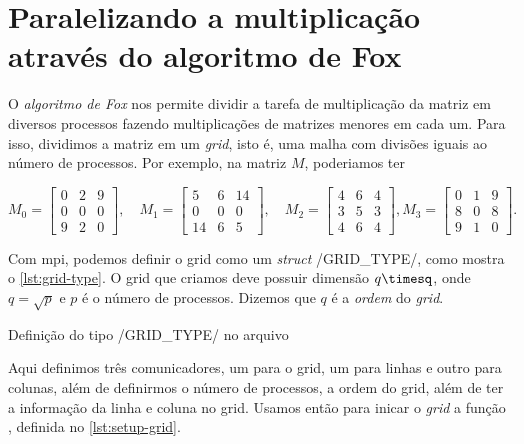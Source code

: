 \section{Paralelizando a multiplicação através do algoritmo de Fox}

O \emph{algoritmo de Fox} nos permite dividir a tarefa de multiplicação
da matriz em diversos processos fazendo multiplicações de matrizes menores
em cada um. Para isso, dividimos a matriz em um \emph{grid}, isto é,
uma malha com divisões iguais ao número de processos. Por exemplo,
na matriz \(M\), poderiamos ter

\[
	M_0 =
	\begin{bmatrix}
		0 & 2 & 9 \\
		0 & 0 & 0 \\
		9 & 2 & 0
	\end{bmatrix},\quad
	M_1 =
	\begin{bmatrix}
		5  & 6 & 14 \\
		0  & 0 & 0  \\
		14 & 6 & 5
	\end{bmatrix},\quad
	M_2 =
	\begin{bmatrix}
		4 & 6 & 4 \\
		3 & 5 & 3 \\
		4 & 6 & 4
	\end{bmatrix},
	M_3 =
	\begin{bmatrix}
		0 & 1 & 9 \\
		8 & 0 & 8 \\
		9 & 1 & 0
	\end{bmatrix}.
\]

Com \ac{mpi}, podemos definir o grid como um \emph{struct}
\cinline/GRID_TYPE/, como mostra o \cref{lst:grid-type}. O grid que criamos deve possuir
dimensão \(q\timesq\), onde \(q=\sqrt{p}\) e \(p\) é o número de processos. Dizemos
que \(q\) é a \emph{ordem} do \emph{grid}.

\begin{listing}
	\caption{Definição do tipo \cinline/GRID_TYPE/ no arquivo }%
	\label{lst:grid-type}
\end{listing}

Aqui definimos três comunicadores, um para o grid, um para linhas e outro para colunas,
além de definirmos o número de processos, a ordem  do grid, além de ter a informação
da linha e coluna no grid. Usamos então para inicar o \emph{grid} a função , %
definida no \cref{lst:setup-grid}.


